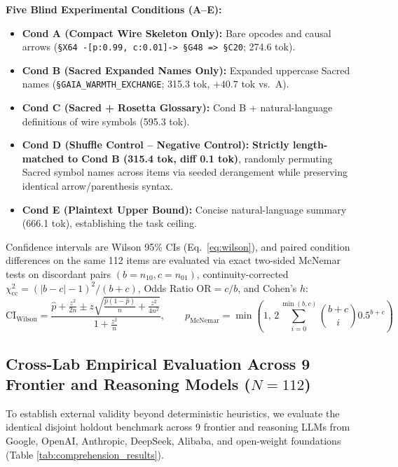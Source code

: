 \documentclass[9pt,a4paper]{extarticle}
\begin{document}
\textbf{Five Blind Experimental Conditions (A--E):}
\begin{itemize}
  \item \textbf{Cond A (Compact Wire Skeleton Only):} Bare opcodes and causal arrows (\texttt{\S X64 -[p:0.99, c:0.01]-> \S G48 => \S C20}; 274.6 tok).
  \item \textbf{Cond B (Sacred Expanded Names Only):} Expanded uppercase Sacred names (\texttt{\S GAIA\_WARMTH\_EXCHANGE}; 315.3 tok, $+40.7$ tok vs.\ A).
  \item \textbf{Cond C (Sacred + Rosetta Glossary):} Cond B + natural-language definitions of wire symbols (595.3 tok).
  \item \textbf{Cond D (Shuffle Control -- Negative Control):} \textbf{Strictly length-matched to Cond B (315.4 tok, diff 0.1 tok)}, randomly permuting Sacred symbol names across items via seeded derangement while preserving identical arrow/parenthesis syntax.
  \item \textbf{Cond E (Plaintext Upper Bound):} Concise natural-language summary (666.1 tok), establishing the task ceiling.
\end{itemize}
Confidence intervals are Wilson 95\% CIs (Eq.\ \ref{eq:wilson}), and paired condition differences on the same 112 items are evaluated via exact two-sided McNemar tests on discordant pairs $(b=n_{10}, c=n_{01})$, continuity-corrected $\chi^2_{\text{cc}} = (|b-c|-1)^2/(b+c)$, Odds Ratio $\text{OR} = c/b$, and Cohen's $h$:
\begin{equation}
  \text{CI}_{\text{Wilson}} = \frac{\hat{p} + \frac{z^2}{2n} \pm z\sqrt{\frac{\hat{p}(1-\hat{p})}{n} + \frac{z^2}{4n^2}}}{1 + \frac{z^2}{n}}, \qquad
  p_{\text{McNemar}} = \min\!\left(1,\, 2\sum_{i=0}^{\min(b, c)} \binom{b+c}{i} 0.5^{b+c}\right)
  \label{eq:wilson}
\end{equation}

\subsection{Cross-Lab Empirical Evaluation Across 9 Frontier and Reasoning Models ($N = 112$)}
To establish external validity beyond deterministic heuristics, we evaluate the identical disjoint holdout benchmark across 9 frontier and reasoning LLMs from Google, OpenAI, Anthropic, DeepSeek, Alibaba, and open-weight foundations (Table \ref{tab:comprehension_results}).
\end{document}
